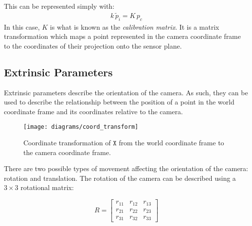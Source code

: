 This can be represented simply with:
\begin{gather}
    k\,\widetilde{p}_i = K\, p_c \label{eq:pi}
\end{gather}
In this case, $K$ is what is known as the \emph{calibration matrix}. It is a matrix transformation which maps a point represented in the camera coordinate frame to the coordinates of their projection onto the sensor plane.

\subsection{Extrinsic Parameters} \label{sec:extrinsics}

Extrinsic parameters describe the orientation of the camera. As such, they can be used to describe the relationship between the position of a point in the world coordinate frame and its coordinates relative to the camera.

\begin{figure}[H]
    \centering
    \texttt{[image: diagrams/coord\_transform]}
    \caption{Coordinate transformation of $\mathtt{X}$ from the world coordinate frame to the camera coordinate frame.}
\end{figure}


There are two possible types of movement affecting the orientation of the camera: rotation and translation. The rotation of the camera can be described using a $3 \times 3$ rotational matrix:

\begin{equation}
    R =
    \begin{bmatrix}
        r_{11} & r_{12} & r_{13} \\
        r_{21} & r_{22} & r_{23} \\
        r_{31} & r_{32} & r_{33}
    \end{bmatrix}
\end{equation}

